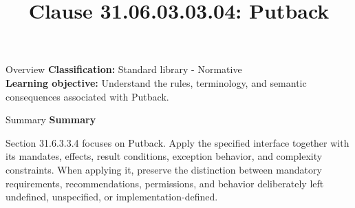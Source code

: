 \documentclass[10pt,letterpaper]{article}
\title{Clause 31.06.03.03.04: Putback}
\author{}
\date{}
\begin{document}
\maketitle
\begin{CornellOverviewBox}{Overview}
\textbf{Classification:} Standard library - Normative\\[2pt]
\textbf{Learning objective:} Understand the rules, terminology, and semantic consequences associated with Putback.
\end{CornellOverviewBox}\begin{CornellSummaryBox}{Summary}
{\sffamily\bfseries\color{Accent} Summary}\par\vspace{3pt}Section 31.6.3.3.4 focuses on Putback. Apply the specified interface together with its mandates, effects, result conditions, exception behavior, and complexity constraints. When applying it, preserve the distinction between mandatory requirements, recommendations, permissions, and behavior deliberately left undefined, unspecified, or implementation-defined.
\end{CornellSummaryBox}
\end{document}
